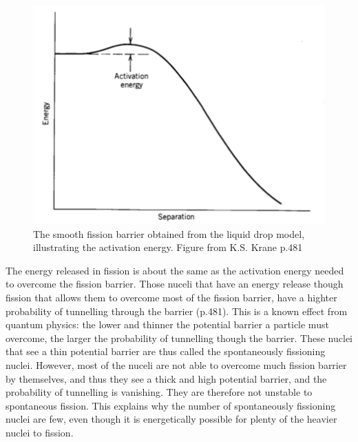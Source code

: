 \documentclass[]{article}
\begin{document}
 \begin{figure} [tbp]
 	\centering
 	\includegraphics[scale=0.7]{smooth_fission_barrier.png}
 	\caption{The smooth fission barrier obtained from the liquid drop model, illustrating the activation energy. Figure from K.S. Krane p.481 \cite{Krane1988}}
 	\label{fig:smooth_fission_barrier}
 \end{figure}

\noindent The energy released in fission is about the same as the activation energy needed to overcome the fission barrier. Those nuceli that have an energy release though fission that allows them to overcome most of the fission barrier, have a highter probability of tunnelling through the barrier \cite{Krane1988} (p.481). This is a known effect from quantum physics: the lower and thinner the potential barrier a particle must overcome, the larger the probability of tunnelling though the barrier. These nuclei that see a thin potential barrier are thus called the spontaneously fissioning nuclei. However, most of the nuceli are not able to overcome much fission barrier by themselves, and thus they see a thick and high potential barrier, and the probability of tunnelling is vanishing. They are therefore not unstable to spontaneous fission. This explains why the number of spontaneously fissioning nuclei are few, even though it is energetically possible for plenty of the heavier nuclei to fission.
\end{document}
